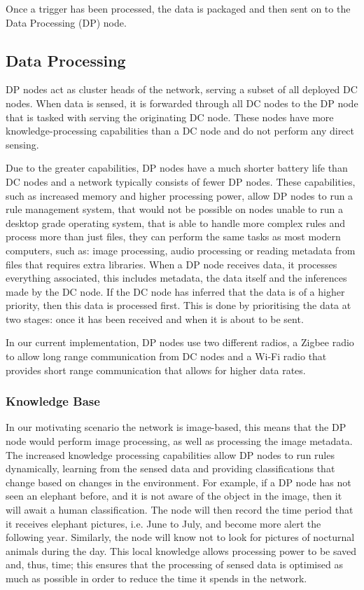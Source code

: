 Once a trigger has been processed, the data is packaged and then sent on to the Data Processing (DP) node.

	\subsection{Data Processing}\label{khas:dp}
	DP nodes act as cluster heads of the network, serving a subset of all deployed DC nodes. When data is sensed, it is forwarded through all DC nodes to the DP node that is tasked with serving the originating DC node. These nodes have more knowledge-processing capabilities than a DC node and do not perform any direct sensing. 

	Due to the greater capabilities, DP nodes have a much shorter battery life than DC nodes and a network typically consists of fewer DP nodes. These capabilities, such as increased memory and higher processing power, allow DP nodes to run a rule management system, that would not be possible on nodes unable to run a desktop grade operating system, that is able to handle more complex rules and process more than just files, they can perform the same tasks as most modern computers, such as: image processing, audio processing or reading metadata from files that requires extra libraries. When a DP node receives data, it processes everything associated, this includes metadata, the data itself and the inferences made by the DC node. If the DC node has inferred that the data is of a higher priority, then this data is processed first. This is done by prioritising the data at two stages: once it has been received and when it is about to be sent.

	In our current implementation, DP nodes use two different radios, a Zigbee radio to allow long range communication from DC nodes and a Wi-Fi radio that provides short range communication that allows for higher data rates.

	\subsubsection{Knowledge Base}
	In our motivating scenario the network is image-based, this means that the DP node would perform image processing, as well as processing the image metadata. The increased knowledge processing capabilities allow DP nodes to run rules dynamically, learning from the sensed data and providing classifications that change based on changes in the environment. For example, if a DP node has not seen an elephant before, and it is not aware of the object in the image, then it will await a human classification. The node will then record the time period that it receives elephant pictures, i.e. June to July, and become more alert the following year. Similarly, the node will know not to look for pictures of nocturnal animals during the day. This local knowledge allows processing power to be saved and, thus, time; this ensures that the processing of sensed data is optimised as much as possible in order to reduce the time it spends in the network.
	
